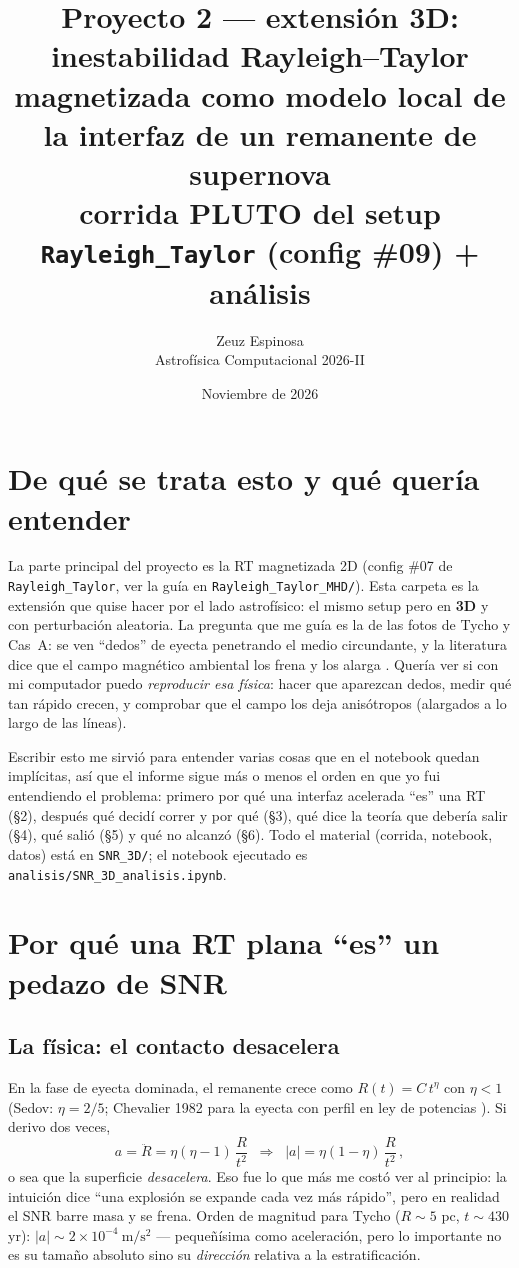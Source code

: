 \documentclass[11pt,a4paper]{article}
\title{\textbf{Proyecto 2 — extensión 3D: inestabilidad Rayleigh--Taylor magnetizada
como modelo local de la interfaz de un remanente de supernova}\\[4pt]
\large corrida PLUTO del setup \texttt{Rayleigh\_Taylor} (config \#09) + análisis}
\author{Zeuz Espinosa\\ Astrof\'isica Computacional 2026-II}
\date{Noviembre de 2026}
\begin{document}
\maketitle

\section{De qué se trata esto y qué quería entender}

La parte principal del proyecto es la RT magnetizada 2D (config \#07 de
\texttt{Rayleigh\_Taylor}, ver la guía en \texttt{Rayleigh\_Taylor\_MHD/}). Esta carpeta es
la extensión que quise hacer por el lado astrofísico: el mismo setup pero en
\textbf{3D} y con perturbación aleatoria. La pregunta que me guía es la de las fotos de
Tycho y Cas~A: se ven ``dedos'' de eyecta penetrando el medio circundante, y la literatura
dice que el campo magnético ambiental los frena y los alarga \cite{orlando2012,
fraschetti2010}. Quería ver si con mi computador puedo \emph{reproducir esa física}:
hacer que aparezcan dedos, medir qué tan rápido crecen, y comprobar que el campo los deja
anisótropos (alargados a lo largo de las líneas).

Escribir esto me sirvió para entender varias cosas que en el notebook quedan implícitas,
así que el informe sigue más o menos el orden en que yo fui entendiendo el problema:
primero por qué una interfaz acelerada ``es'' una RT (\S2), después qué decidí correr y
por qué (\S3), qué dice la teoría que debería salir (\S4), qué salió (\S5) y qué no
alcanzó (\S6). Todo el material (corrida, notebook, datos) está en \texttt{SNR\_3D/};
el notebook ejecutado es \texttt{analisis/SNR\_3D\_analisis.ipynb}.

\section{Por qué una RT plana ``es'' un pedazo de SNR}

\subsection{La física: el contacto desacelera}

En la fase de eyecta dominada, el remanente crece como $R(t)=C\,t^\eta$ con $\eta<1$
(Sedov: $\eta=2/5$; Chevalier 1982 para la eyecta con perfil en ley de potencias
\cite{warren2013}). Si derivo dos veces,
\begin{equation}
a=\ddot{R}=\eta(\eta-1)\,\frac{R}{t^2}
\;\;\Longrightarrow\;\;
|a|=\eta(1-\eta)\,\frac{R}{t^2}\,,
\label{eq:geff}
\end{equation}
o sea que la superficie \emph{desacelera}. Eso fue lo que más me costó ver al principio:
la intuición dice ``una explosión se expande cada vez más rápido'', pero en realidad el
SNR barre masa y se frena. Orden de magnitud para Tycho ($R\sim5$ pc, $t\sim430$ yr):
$|a|\sim2\times10^{-4}\ \mathrm{m/s^2}$ --- pequeñísima como aceleración, pero lo
importante no es su tamaño absoluto sino su \emph{dirección} relativa a la estratificación.
\end{document}
